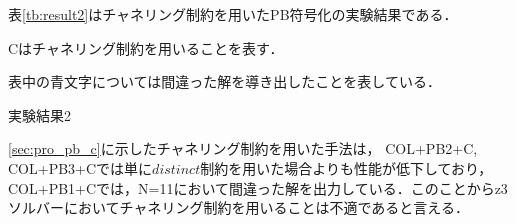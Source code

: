表\ref{tb:result2}はチャネリング制約を用いたPB符号化の実験結果である．

Cはチャネリング制約を用いることを表す．

表中の青文字については間違った解を導き出したことを表している．
\begin{table}[htb]
    \caption{実験結果2}
{\tiny \label{tb:result2}}
\end{table}

\ref{sec:pro_pb_c}に示したチャネリング制約を用いた手法は，
COL+PB2+C, COL+PB3+Cでは単に$distinct$制約を用いた場合よりも性能が低下しており，
COL+PB1+Cでは，N=11において間違った解を出力している．このことからz3ソルバーにおいてチャネリング制約を用いることは不適であると言える．


